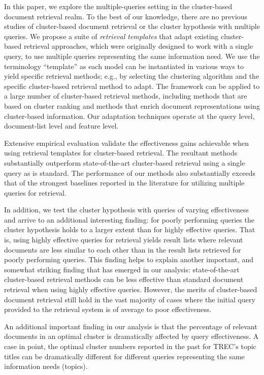 In this paper, we explore the multiple-queries setting in the
cluster-based document retrieval realm.
To the best of our knowledge, there are no previous studies of
cluster-based document retrieval or the cluster hypothesis with
multiple queries.
We propose a suite of {\em retrieval templates} that adapt existing
cluster-based retrieval approaches, which were originally designed to
work with a single query, to use multiple queries representing the
same information need.
We use the terminology ``template'' as each model can be instantiated
in various ways to yield specific retrieval methods; e.g., by
selecting the clustering algorithm and the specific cluster-based
retrieval method to adapt.
The framework can be applied to a large number of cluster-based
retrieval methods, including methods that are based on cluster
ranking and methods that enrich document representations using
cluster-based information.
Our adaptation techniques operate at the query level, document-list
level and feature level.

Extensive empirical evaluation validate the effectiveness gains
achievable when using retrieval templates for cluster-based
retrieval.
The resultant methods substantially outperform state-of-the-art
cluster-based retrieval using a single query as is standard.
The performance of our methods also substantially exceeds that of the
strongest baselines reported in the literature for utilizing multiple
queries for retrieval.

In addition, we test the cluster hypothesis with queries of varying
effectiveness and arrive to an additional interesting finding: for
poorly performing queries the cluster hypothesis holds to a larger
extent than for highly effective queries.
That is, using highly effective queries for retrieval yields result
lists where relevant documents are less similar to each other than
in the result lists retrieved for poorly performing queries.
This finding helps to explain another important, and somewhat
striking finding that has emerged in our analysis: state-of-the-art
cluster-based retrieval methods can be less effective than standard
document retrieval when using highly effective queries.
However, the merits of cluster-based document retrieval still hold in
the vast majority of cases where the initial query provided to the
retrieval system is of average to poor effectiveness.

An additional important finding in our analysis is that the percentage
of relevant documents in an optimal cluster is dramatically affected
by query effectiveness.
A case in point, the optimal cluster numbers reported in the past for
TREC's topic titles \cite{Liu+Croft:06b,Kurland+Domshlak:08a} can be
dramatically different for different queries representing the same
information needs (topics).

